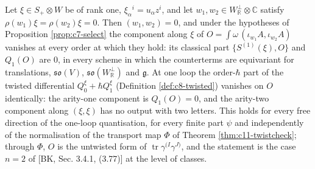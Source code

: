 \begin{proposition}
\label{prop:c11-plane}
Let $\xi\in S_+\otimes W$ be of rank one, $\xi_\alpha{}^i=u_\alpha z^i$, and let $w_1,w_2\in W_{\mathbb R}^\perp\otimes\mathbb C$ satisfy $\rho(w_1)\xi=\rho(w_2)\xi=0$. Then $(w_1,w_2)=0$, and under the hypotheses of Proposition \ref{prop:c7-select} the component along $\xi$ of $O=\int\omega\,(\iota_{w_1}A,\iota_{w_2}A)$ vanishes at every order at which they hold: its classical part $\{S^{(1)}(\xi),O\}$ and $Q_1(O)$ are $0$, in every scheme in which the counterterms are equivariant for translations, $\mathfrak{so}(V)$, $\mathfrak{so}(W_{\mathbb R}^\perp)$ and $\mathfrak g$. At one loop the order-$\hbar$ part of the twisted differential $Q^\xi_0+\hbar Q^\xi_1$ (Definition \ref{def:c8-twisted}) vanishes on $O$ identically: the arity-one component is $Q_1(O)=0$, and the arity-two component along $(\xi,\xi)$ has no output with two letters. This holds for every free direction of the one-loop quantisation, for every finite part $\psi$ and independently of the normalisation of the transport map $\Phi$ of Theorem \ref{thm:c11-twistcheck}; through $\Phi$, $O$ is the untwisted form of $\operatorname{tr}\gamma^{(I}\gamma^{J)}$, and the statement is the case $n=2$ of [BK, Sec. 3.4.1, (3.77)] at the level of classes.
\end{proposition}
